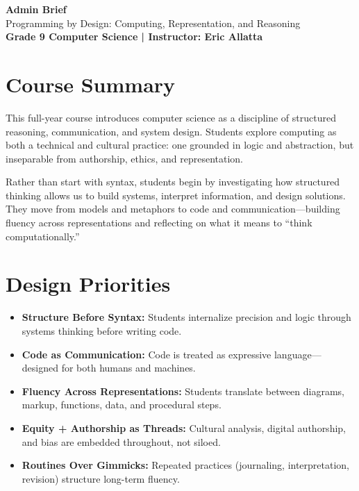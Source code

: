 \documentclass[11pt]{article}
\begin{document}
\begin{center}
  {\LARGE \textbf{Admin Brief}} \\[0.25em]
  {\large Programming by Design: Computing, Representation, and Reasoning} \\[0.5em]
  \textbf{Grade 9 Computer Science \quad | \quad Instructor: Eric Allatta}
\end{center}

\section*{Course Summary}
This full-year course introduces computer science as a discipline of structured reasoning, communication, and system design. Students explore computing as both a technical and cultural practice: one grounded in logic and abstraction, but inseparable from authorship, ethics, and representation.

Rather than start with syntax, students begin by investigating how structured thinking allows us to build systems, interpret information, and design solutions. They move from models and metaphors to code and communication—building fluency across representations and reflecting on what it means to “think computationally.”

\section*{Design Priorities}
\begin{itemize}[leftmargin=*]
  \item \textbf{Structure Before Syntax:} Students internalize precision and logic through systems thinking before writing code.
  \item \textbf{Code as Communication:} Code is treated as expressive language—designed for both humans and machines.
  \item \textbf{Fluency Across Representations:} Students translate between diagrams, markup, functions, data, and procedural steps.
  \item \textbf{Equity + Authorship as Threads:} Cultural analysis, digital authorship, and bias are embedded throughout, not siloed.
  \item \textbf{Routines Over Gimmicks:} Repeated practices (journaling, interpretation, revision) structure long-term fluency.
\end{itemize}
\end{document}
